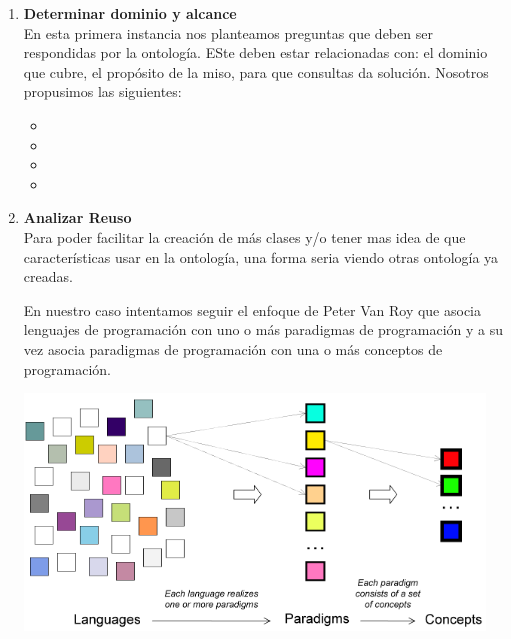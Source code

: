 \documentclass[12pt, titlepage, a4paper]{article}
\begin{document}
\begin{enumerate}
    \item {\textbf{Determinar dominio y alcance}\\
           En esta primera instancia nos planteamos preguntas que deben 
           ser respondidas por la ontología. ESte deben estar relacionadas 
           con: el dominio que cubre, el propósito de la miso, para que 
           consultas da solución. Nosotros propusimos las siguientes:
           \begin{itemize}
                \item {}
                \item {}
                \item {} 
                \item {}
           \end{itemize}}
    \newpage
    \item {\textbf{Analizar Reuso}\\
           Para poder facilitar la creación de más clases y/o tener mas 
           idea de que características usar en la ontología, una 
           forma seria viendo otras ontología ya creadas.

           En nuestro caso intentamos seguir el enfoque de Peter Van Roy\cite{vanroy} que
           asocia lenguajes de programación con uno o más paradigmas de programación
           y a su vez asocia paradigmas de programación con una o más conceptos de programación.\\

           \begin{center}
            \includegraphics[scale=0.75]{Imagenes/lenguajesParadigmasConceptos.png}
           \end{center}

}
\end{enumerate}
\end{document}
